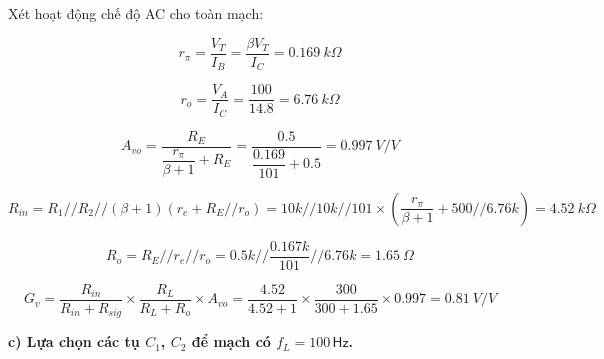 Xét hoạt động chế độ AC cho toàn mạch:

\[
r_\pi = \frac{V_T}{I_B} = \frac{\beta V_T}{I_C} = 0.169\ k\Omega
\]

\[
r_o = \frac{V_A}{I_C} = \frac{100}{14.8} = 6.76\ k\Omega
\]

\[
A_{vo} = \frac{R_E}{\dfrac{r_\pi}{\beta + 1} + R_E} 
= \frac{0.5}{\dfrac{0.169}{101} + 0.5} 
= 0.997\ V/V
\]

\[
R_{in} = R_1 // R_2 // (\beta + 1)\left(r_e + R_E // r_o\right) = 10k // 10k // 101 \times \left(\frac{r_\pi}{\beta + 1} + 500 // 6.76k\right)
= 4.52\ k\Omega
\]

\[
R_o = R_E // r_e // r_o 
= 0.5k // \frac{0.167k}{101} // 6.76k 
= 1.65\ \Omega
\]

\[
G_v = \frac{R_{in}}{R_{in} + R_{sig}} \times 
\frac{R_L}{R_L + R_o} \times A_{vo} 
= \frac{4.52}{4.52 + 1} \times 
\frac{300}{300 + 1.65} \times 0.997 
= 0.81\ V/V
\]



\textbf{c) Lựa chọn các tụ $C_{1}$, $C_{2}$ để mạch có $f_{L}=100\,\textsf{Hz}$.}